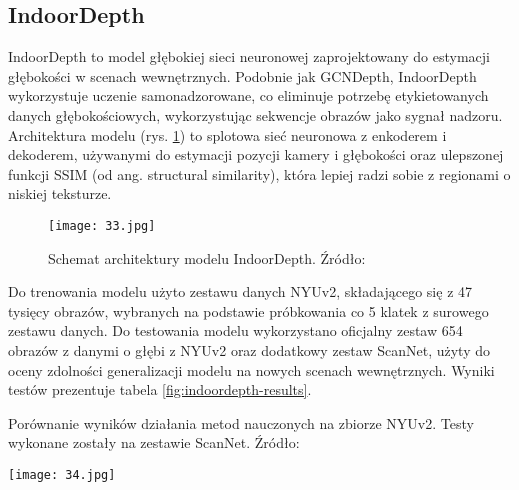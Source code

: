 \subsection{IndoorDepth}
IndoorDepth \cite{fan2023deeper} to model głębokiej sieci neuronowej zaprojektowany do estymacji głębokości w scenach wewnętrznych. Podobnie jak GCNDepth, IndoorDepth wykorzystuje uczenie samonadzorowane, co eliminuje potrzebę etykietowanych danych głębokościowych, wykorzystując sekwencje obrazów jako sygnał nadzoru. Architektura modelu (rys. \ref{fig:indoordepth-architecture}) to splotowa sieć neuronowa z enkoderem i dekoderem, używanymi do estymacji pozycji kamery i głębokości oraz ulepszonej funkcji SSIM (od ang. structural similarity), która lepiej radzi sobie z regionami o niskiej teksturze.
\begin{figure}[H]
    \centering
    \texttt{[image: 33.jpg]}
    \caption{Schemat architektury modelu IndoorDepth. Źródło: \cite{fan2023deeper}}
    \label{fig:indoordepth-architecture}
\end{figure}
Do trenowania modelu użyto zestawu danych NYUv2, składającego się z 47 tysięcy obrazów, wybranych na podstawie próbkowania co 5 klatek z surowego zestawu danych. Do testowania modelu wykorzystano oficjalny zestaw 654 obrazów z danymi o głębi z NYUv2 oraz dodatkowy zestaw ScanNet, użyty do oceny zdolności generalizacji modelu na nowych scenach wewnętrznych. Wyniki testów prezentuje tabela \ref{fig:indoordepth-results}.
\begin{table}[H]
    \centering
    \caption{Porównanie wyników działania metod nauczonych na zbiorze NYUv2. Testy wykonane zostały na zestawie ScanNet. Źródło: \cite{fan2023deeper}}
    \texttt{[image: 34.jpg]}
    \label{fig:indoordepth-results}
\end{table}

